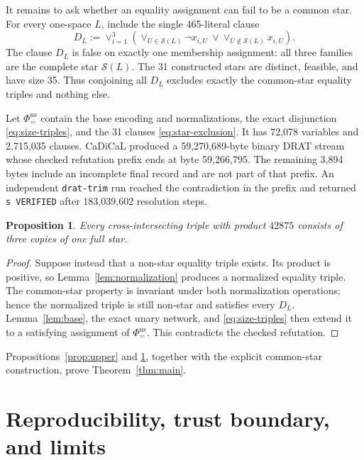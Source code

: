 \documentclass[11pt]{article}
\newtheorem{proposition}[theorem]{Proposition}
\newcommand{\cS}{\mathcal S}
\begin{document}
It remains to ask whether an equality assignment can fail to be a common
star.  For every one-space $L$, include the single 465-literal clause
\begin{equation}\label{eq:star-exclusion}
 D_L:=\mathop{\vee}_{i=1}^3\left(
   \mathop{\vee}_{U\in\cS(L)}\lnot x_{i,U}
   \ \vee\!
   \mathop{\vee}_{U\notin\cS(L)}x_{i,U}
 \right).
\end{equation}
The clause $D_L$ is false on exactly one membership assignment: all three
families are the complete star $\cS(L)$.  The 31 constructed stars are
distinct, feasible, and have size 35.  Thus conjoining all $D_L$ excludes
exactly the common-star equality triples and nothing else.

Let $\Phi_{=}^{\mathrm{ns}}$ contain the base encoding and normalizations, the
exact disjunction \eqref{eq:size-triples}, and the 31 clauses
\eqref{eq:star-exclusion}.  It has 72,078 variables and 2,715,035 clauses.
CaDiCaL produced a 59,270,689-byte binary DRAT stream whose checked
refutation prefix ends at byte 59,266,795.  The remaining 3,894 bytes include
an incomplete final record and are not part of that prefix.  An independent
\texttt{drat-trim} run reached the contradiction in the prefix and returned
\texttt{s VERIFIED} after 183,039,602 resolution steps.

\begin{proposition}\label{prop:equality}
Every cross-intersecting triple with product $42875$ consists of three copies
of one full star.
\end{proposition}

\begin{proof}
Suppose instead that a non-star equality triple exists.  Its product is
positive, so Lemma~\ref{lem:normalization} produces a normalized equality
triple.  The common-star property is invariant under both normalization
operations; hence the normalized triple is still non-star and satisfies every
$D_L$.  Lemma~\ref{lem:base}, the exact unary network, and
\eqref{eq:size-triples} then extend it to a satisfying assignment of
$\Phi_{=}^{\mathrm{ns}}$.  This contradicts the checked refutation.
\end{proof}

Propositions~\ref{prop:upper} and \ref{prop:equality}, together with the
explicit common-star construction, prove Theorem~\ref{thm:main}.

\section{Reproducibility, trust boundary, and limits}
\end{document}
